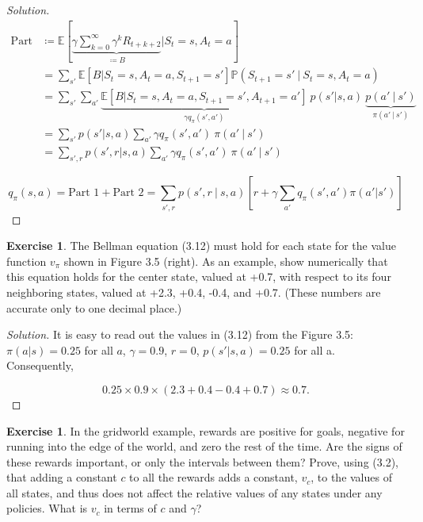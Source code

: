 \documentclass[oneside,11pt]{article}
\theoremstyle{definition}
\newtheorem{exer}[thm]{Exercise}
\newcommand{\PP}{\mathbb{P}}
\newcommand{\EE}{\mathbb{E}}
\newcommand\givenbase[1][]{\:#1\lvert\:}
\let\given\givenbase
\newenvironment{solution}
{\renewcommand\qedsymbol{$\blacksquare$}\begin{proof}[Solution]} {\end{proof}}
\begin{document}
\begin{shaded}
\begin{solution}
\begin{equation*} %
\begin{split}
\text{Part 2} & \coloneqq  \EE \left [\underbrace{\gamma \sum_{k=0}^{\infty}\gamma^k R_{t+ k +2}}_{\coloneqq B} | S_t = s, A_t = a \right ] \\
 & = \sum_{s'} \EE \left [ B | S_t = s, A_t = a, S_{t+1} = s' \right ] \PP(S_{t+1} = s' \given S_t = s, A_t = a) \\
& = \sum_{s'} \sum_{a'} \underbrace{\EE \left [ B | S_t = s, A_t = a, S_{t+1} = s', A_{t+1} = a' \right ]}_{\gamma q_{\pi}(s',a')}~p(s' | s,a)~\underbrace{p(a' \given s')}_{\pi(a' \given s')} \\
& = \sum_{s'} p(s' | s,a) \sum_{a'} \gamma q_{\pi}(s',a')~\pi(a' \given s') \\
& = \sum_{s',r} p(s',r | s,a) \sum_{a'} \gamma q_{\pi}(s',a')~\pi(a' \given s')
\end{split}
\end{equation*}

\[ q_{\pi}(s,a) = \text{Part 1} + \text{Part 2} =  \sum\limits_{s', r} p(s',r \given s, a) \left [ r + \gamma \sum_{a'}  q_{\pi}(s', a') \pi(a' | s') \right ]\]

\end{solution}
\end{shaded}





\begin{exer}
The Bellman equation (3.12) must hold for each state for the value function $v_{\pi}$ shown in Figure 3.5 (right). As an example, show numerically that this equation holds for the center state, valued at +0.7, with respect to its four neighboring states, valued at +2.3, +0.4, -0.4, and +0.7. (These numbers are accurate only to one decimal place.)
\end{exer}

\begin{shaded}
\begin{solution} 

It is easy to read out the values in (3.12) from the Figure 3.5: $\pi(a|s) = 0.25$ for all $a$, $\gamma = 0.9$, $r= 0$, $p(s'| s, a) = 0.25$ for all a. Consequently,  

\[ 0.25\times 0.9 \times (2.3 + 0.4 - 0.4 + 0.7) \approx 0.7. \]
\end{solution}
\end{shaded}



\begin{exer}
In the gridworld example, rewards are positive for goals, negative for running into the edge of the world, and zero the rest of the time. Are the signs of these rewards important, or only the intervals between them? Prove, using (3.2), that adding a constant $c$ to all the rewards adds a constant, $v_c$, to the values of all states, and thus does not affect the relative values of any states under any policies. What is $v_c$ in terms of $c$ and $\gamma$?
\end{exer}
\end{document}
